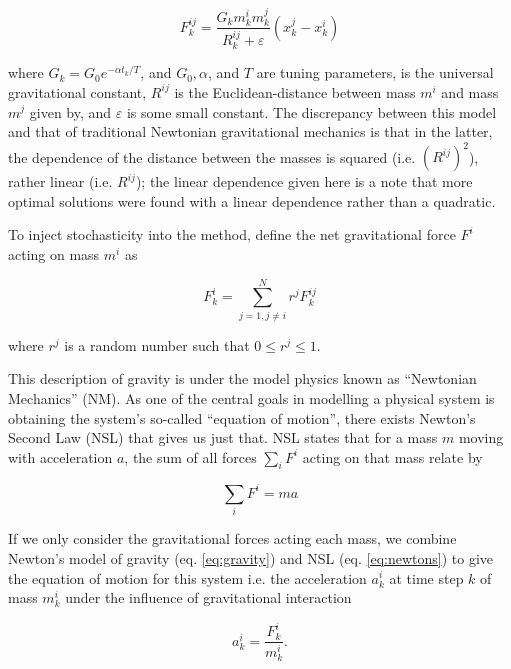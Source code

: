 \documentclass{article}
\begin{document}
        \begin{equation}
            F_k^{ij} = \frac{G_k m_k^i m_k^j}{R_k^{ij} + \varepsilon} \left(x_k^j - x_k^i \right)
        \end{equation}

        where $G_k = G_0 e^{-\alpha t_k /T}$, and $G_0, \alpha$, and $T$ are tuning parameters, is the universal gravitational constant, $R^{ij}$ is the Euclidean-distance between mass $m^i$ and mass $m^j$ given by, and $\varepsilon$ is some small constant.  The discrepancy between this model and that of traditional Newtonian gravitational mechanics is that in the latter, the dependence of the distance between the masses is squared (i.e. $\left(R^{ij}\right)^2$), rather linear (i.e. $R^{ij}$); the linear dependence given here is a note that more optimal solutions were found\cite{GSA} with a linear dependence rather than a quadratic.

        To inject stochasticity into the method, define the net gravitational force $F^i$ acting on mass $m^i$ as 

        \begin{equation}\label{eq:gravity}
            F_k^i = \sum_{j = 1, j \neq i}^{N} r^j F_k^{ij}
        \end{equation}

        where $r^j$ is a random number such that $0 \leq r^j \leq 1$.

\pagebreak

        This description of gravity is under the model physics known as ``Newtonian Mechanics'' (NM).  As one of the central goals in modelling a physical system is obtaining the system's so-called ``equation of motion'', there exists Newton's Second Law (NSL) that gives us just that.  NSL states that for a mass $m$ moving with acceleration $a$, the sum of all forces $\sum_i F^i$ acting on that mass relate by

        \begin{equation}\label{eq:newtons}
            \sum_i F^i = m a
        \end{equation}

        If we only consider the gravitational forces acting each mass, we combine Newton's model of gravity (eq. \ref{eq:gravity}) and NSL (eq. \ref{eq:newtons}) to give the equation of motion for this system i.e. the acceleration $a_k^i$ at time step $k$ of mass $m_k^i$ under the influence of gravitational interaction

        \begin{equation}\label{eq:eom}
            a_k^i = \frac{F_k^i}{m_k^i}.
        \end{equation}
\end{document}
